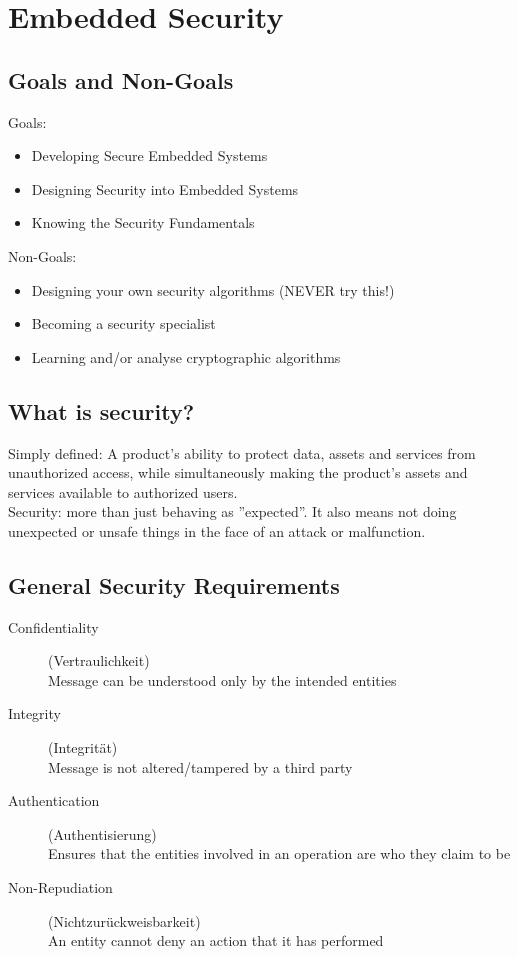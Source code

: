 \section{Embedded Security}

\subsection{Goals and Non-Goals}
\begin{multicols}{2}
  Goals:
  \begin{itemize}
    \item Developing Secure Embedded Systems
    \item Designing Security into Embedded Systems
    \item Knowing the Security Fundamentals
  \end{itemize}
  \vfill\null
  \columnbreak
  Non-Goals:
  \begin{itemize}
    \item Designing your own security algorithms (NEVER try this!)
    \item Becoming a security specialist
    \item Learning and/or analyse cryptographic algorithms
  \end{itemize}
  \vfill\null
\end{multicols}

\subsection{What is security?}
Simply defined: A product's ability to protect data, assets and services from unauthorized access, while simultaneously making the product's assets and services available to authorized users.\\

Security: more than just behaving as ''expected''. It also means not doing unexpected or unsafe things in the face of an attack or malfunction.

\subsection{General Security Requirements}
\begin{description}
  \item[Confidentiality] (Vertraulichkeit)\\ Message can be understood only by the intended entities
  \item[Integrity] (Integrität)\\ Message is not altered/tampered by a third party
  \item[Authentication] (Authentisierung)\\ Ensures that the entities involved in an operation are who they claim to be
  \item[Non-Repudiation] (Nichtzurückweisbarkeit)\\ An entity cannot deny an action that it has performed
\end{description}

